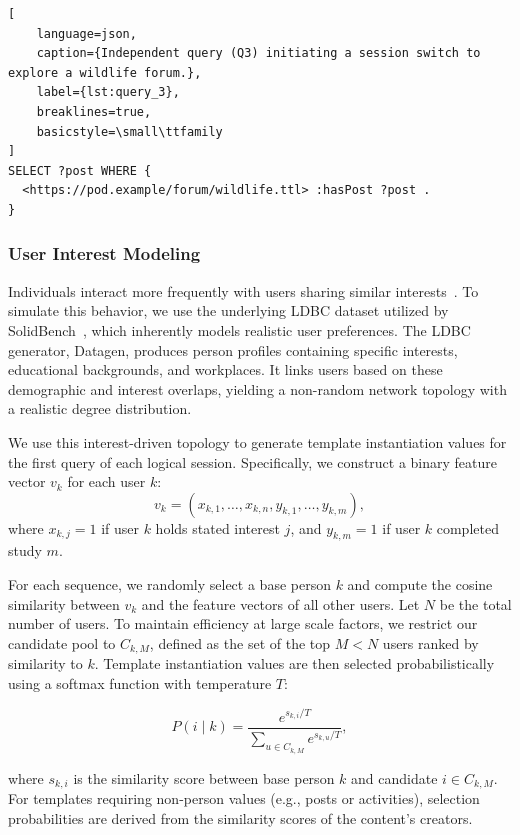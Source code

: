\begin{lstlisting}[
    language=json,
    caption={Independent query (Q3) initiating a session switch to explore a wildlife forum.},
    label={lst:query_3},
    breaklines=true,
    basicstyle=\small\ttfamily
]
SELECT ?post WHERE {
  <https://pod.example/forum/wildlife.ttl> :hasPost ?post .
}
\end{lstlisting}

\subsubsection{User Interest Modeling}

Individuals interact more frequently with users sharing similar interests~\cite{mitzlaff2013user}. 
To simulate this behavior, we use the underlying LDBC dataset utilized by SolidBench~\cite{erling2015ldbc}, 
which inherently models realistic user preferences. 
The LDBC generator, Datagen, produces person profiles containing specific interests, 
educational backgrounds, and workplaces. 
It links users based on these demographic and interest overlaps, 
yielding a non-random network topology with a realistic degree distribution.

We use this interest-driven topology to generate template instantiation values 
for the first query of each logical session. 
Specifically, we construct a binary feature vector $v_{k}$ for each user $k$:
\begin{equation}
 v_{k} = (x_{k,1}, \dots, x_{k,n}, y_{k,1}, \dots, y_{k,m}),
\end{equation}
where $x_{k,j}=1$ if user $k$ holds stated interest $j$, and $y_{k,m}=1$ 
if user $k$ completed study $m$.

For each sequence, we randomly select a base person $k$ and compute the cosine similarity 
between $v_{k}$ and the feature vectors of all other users.
Let $N$ be the total number of users. To maintain efficiency at large scale factors, 
we restrict our candidate pool to $C_{k,M}$, defined as the set of the top $M < N$ users 
ranked by similarity to $k$. 
Template instantiation values are then selected probabilistically using a softmax function 
with temperature $T$:

\begin{equation}
   P(i \mid k) = \frac{e^{s_{k,i} / T}}{\sum_{u \in C_{k,M}} e^{s_{k,u} / T}},
\end{equation}

where $s_{k,i}$ is the similarity score between base person $k$ and candidate $i \in C_{k,M}$. 
For templates requiring non-person values (e.g., posts or activities),
selection probabilities are derived from the similarity scores of the content's creators.


